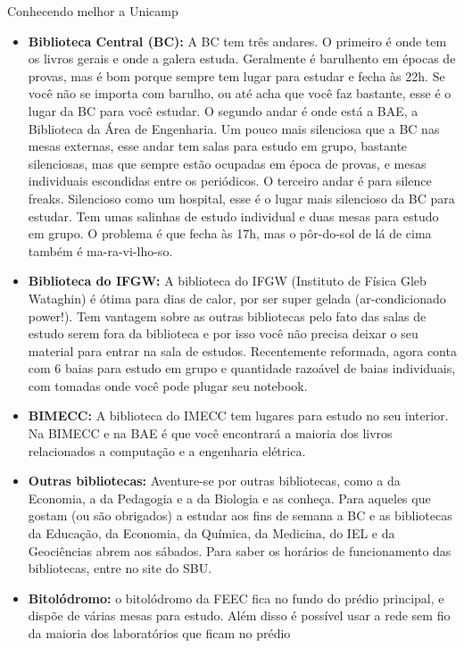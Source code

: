 \begin{story}{Conhecendo melhor a Unicamp}
\begin{itemize}
\item \textbf{Biblioteca Central (BC):} A BC tem três andares. O primeiro é onde tem os livros gerais e onde a galera estuda. Geralmente é barulhento em épocas de provas, mas é bom porque sempre tem lugar para estudar e fecha às 22h. Se você não se importa com barulho, ou até acha que você faz bastante, esse é o lugar da BC para você estudar. O segundo andar é onde está a BAE, a Biblioteca da Área de Engenharia. Um pouco mais silenciosa que a BC nas mesas externas, esse andar tem salas para estudo em grupo, bastante silenciosas, mas que sempre estão ocupadas em época de provas, e mesas individuais escondidas entre os periódicos. O terceiro andar é para silence freaks. Silencioso como um hospital, esse é o lugar mais silencioso da BC para estudar. Tem umas salinhas de estudo individual e duas mesas para estudo em grupo. O problema é que fecha às 17h, mas o pôr-do-sol de lá de cima também é ma-ra-vi-lho-so.

\item \textbf{Biblioteca do IFGW:} A biblioteca do IFGW (Instituto de Física Gleb Wataghin) é ótima para dias de calor, por ser super gelada (ar-condicionado power!). Tem vantagem sobre as outras bibliotecas pelo fato das salas de estudo serem fora da biblioteca e por isso você não precisa deixar o seu material para entrar na sala de estudos. Recentemente reformada, agora conta com 6 baias para estudo em grupo e quantidade razoável de baias individuais, com tomadas onde você pode plugar seu notebook.

\item \textbf{BIMECC:} A biblioteca do IMECC tem lugares para estudo no seu interior. Na BIMECC e na BAE é que você encontrará a maioria dos livros relacionados a computação e a engenharia elétrica.

\item \textbf{Outras bibliotecas:} Aventure-se por outras bibliotecas, como a da Economia, a da Pedagogia e a da Biologia e as conheça. Para aqueles que gostam (ou são obrigados) a estudar aos fins de semana a BC e as bibliotecas da Educação, da Economia, da Química, da Medicina, do IEL e da Geociências abrem aos sábados. Para saber os horários de funcionamento das bibliotecas, entre no site do SBU.

\item \textbf{Bitolódromo:} o bitolódromo da FEEC fica no fundo do prédio principal, e dispõe de várias mesas para estudo. Além disso é possível usar a rede sem fio da maioria dos laboratórios que ficam no prédio


\end{itemize}
\end{story}
